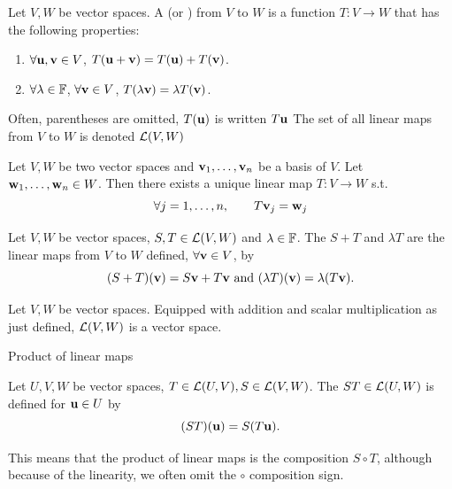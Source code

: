 \documentclass[aspectratio=169]{beamer}
\begin{document}
\begin{frame}
\begin{definition}
Let $V,W$ be vector spaces. A  (or ) from $V$ to $W$ is a function $T:V\to W$ that has the following properties:
\begin{enumerate}
\item {} $\forall \mathbf{u},\mathbf{v}\in V$, $T(\mathbf{u}+\mathbf{v})=T(\mathbf{u})+T(\mathbf{v})$.
\item {} $\forall\lambda\in\mathbb{F}$, $\forall \mathbf{v}\in V$, $T(\lambda \mathbf{v})=\lambda T(\mathbf{v})$.
\end{enumerate}
\end{definition}
\vfill
Often, parentheses are omitted, $T(\mathbf{u})$ is written $T\mathbf{u}$
\vfill
The set of all linear maps from $V$ to $W$ is denoted $\mathcal{L}(V,W)$
\end{frame}


\begin{frame}
\begin{importanttheorem}
Let $V,W$ be two vector spaces and $\mathbf{v}_1,\ldots,\mathbf{v}_n$ be a basis of $V$. Let $\mathbf{w}_1,\ldots,\mathbf{w}_n\in W$. Then there exists a unique linear map $T:V\to W$ s.t.
\[
\forall j=1,\ldots,n,\qquad T\mathbf{v}_j=\mathbf{w}_j
\]
\end{importanttheorem}
\end{frame}


\begin{frame}
\begin{definition}
\label{def:add_scalar_mult_linear_maps}
Let $V,W$ be vector spaces, $S,T\in\mathcal{L}(V,W)$ and $\lambda\in\mathbb{F}$. 
The  $S+T$ and  $\lambda T$ are the linear maps from $V$ to $W$ defined, $\forall \mathbf{v}\in V$, by
\[
(S+T)(\mathbf{v})=S\mathbf{v}+T\mathbf{v}\textrm{ and }(\lambda T)(\mathbf{v})=\lambda(T\mathbf{v}).
\]
\end{definition}
\vfill
\begin{importanttheorem}
Let $V,W$ be vector spaces. Equipped with addition and scalar multiplication as just defined, $\mathcal{L}(V,W)$ is a vector space.
\end{importanttheorem}
\end{frame}

\begin{frame}{Product of linear maps}
\begin{definition}
Let $U,V,W$ be vector spaces, $T\in\mathcal{L}(U,V),S\in\mathcal{L}(V,W)$. The  $ST\in\mathcal{L}(U,W)$ is defined for $\mathbf{u}\in U$ by
\[
(ST)(\mathbf{u})=S(T\mathbf{u}).
\]
\end{definition}
This means that the product of linear maps is the composition $S\circ T$, although because of the linearity, we often omit the $\circ$ composition sign.
\end{frame}
\end{document}
